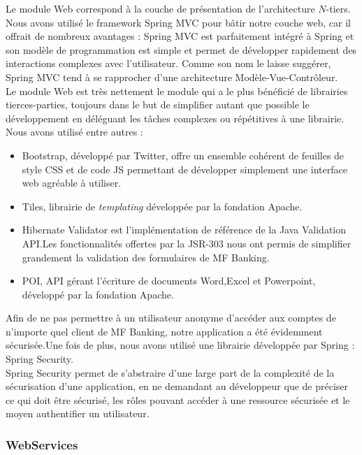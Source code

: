 Le module Web correspond à la couche de présentation de l'architecture $N$-tiers.\\
Nous avons utilisé le framework Spring MVC pour bâtir notre couche web, car il offrait de nombreux avantages : Spring MVC est parfaitement intégré à Spring et son modèle de programmation est simple et permet de développer rapidement des interactions complexes avec l'utilisateur. Comme son nom le laisse suggérer, Spring MVC tend à se rapprocher d'une architecture Modèle-Vue-Contrôleur.\\

Le module Web est très nettement le module qui a le plus bénéficié de librairies tierces-parties, toujours dans le but de simplifier autant que possible le développement en déléguant les tâches complexes ou répétitives à une librairie.\\
Nous avons utilisé entre autres : 
\begin{itemize}
	\item Bootstrap, développé par Twitter, offre un ensemble cohérent de feuilles de style CSS et de code JS permettant de développer simplement une interface web agréable à utiliser.
	\item Tiles, librairie de \textit{templating} développée par la fondation Apache.
	\item Hibernate Validator est l'implémentation de référence de la Java Validation API.Les fonctionnalités offertes par la JSR-303 nous ont permis de simplifier grandement la validation des formulaires de MF Banking.
	\item POI, API gérant l'écriture de documents Word,Excel et Powerpoint, développé par la fondation Apache.\\
\end{itemize}

Afin de ne pas permettre à un utilisateur anonyme d'accéder aux comptes de n'importe quel client de MF Banking, notre application a été évidemment sécurisée.Une fois de plus, nous avons utilisé une librairie développée par Spring : Spring Security.\\
Spring Security permet de s'abstraire d'une large part de la complexité de la sécurisation d'une application, en ne demandant au développeur que de préciser ce qui doit \^etre sécurisé, les rôles pouvant accéder à une ressource sécurisée et le moyen authentifier un utilisateur.

\subsubsection*{WebServices} 

